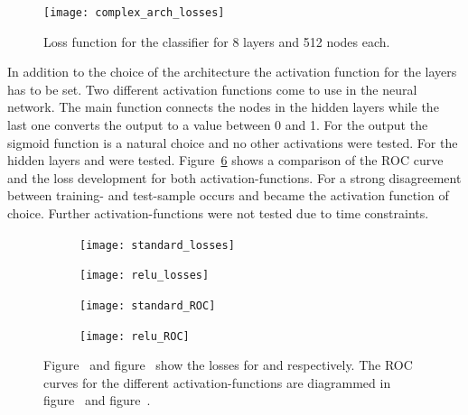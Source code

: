 \begin{figure}[htbp]
	\centering
	\texttt{[image: complex\_arch\_losses]}
	\caption[Classifier losses for a complex architecture]{Loss function for the classifier for \num{8} layers and \num{512} nodes each.}
	\label{fig:complex_arch}
\end{figure}

In addition to the choice of the architecture the activation function for the layers has to be set.
Two different activation functions come to use in the neural network. The main function connects the nodes in the hidden layers while the last one converts the output to a value between \num{0} and \num{1}. For the output the sigmoid function is a natural choice and no other activations were tested.
For the hidden layers \ELU and \RELU were tested. Figure~\ref{fig:activ} shows a comparison of the ROC curve and the loss development for both activation-functions. For \RELU a strong disagreement between training- and test-sample occurs and \ELU became the activation function of choice. Further activation-functions were not tested due to time constraints.

\begin{figure}[htbp]
    \centering
    \begin{subfigure}[b]{0.48\textwidth}
        \texttt{[image: standard\_losses]}
        \caption{}
        \label{fig:activ:standard:loss}
    \end{subfigure}
\quad
    \begin{subfigure}[b]{0.48\textwidth}
        \texttt{[image: relu\_losses]}
        \caption{}
        \label{fig:activ:relu:loss}
    \end{subfigure}

    \begin{subfigure}[b]{0.48\textwidth}
		\texttt{[image: standard\_ROC]}
		\caption{}
		\label{fig:activ:standard:roc}
	\end{subfigure}
\quad
	\begin{subfigure}[b]{0.48\textwidth}
		\texttt{[image: relu\_ROC]}
		\caption{}
		\label{fig:activ:relu:roc}
	\end{subfigure}
    \caption[Classifier performance for different activation functions]{Figure~ and figure~ show the losses for \ELU and \RELU respectively. The ROC curves for the different activation-functions are diagrammed in figure~ and figure~.}
	\label{fig:activ}
\end{figure}


